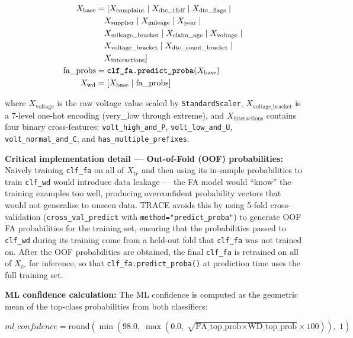 \documentclass[10pt]{article}
\begin{document}
\begin{align}
X_{\text{base}} &= [X_{\text{complaint}} \mid X_{\text{dtc\_tfidf}} \mid X_{\text{dtc\_flags}} \mid {} \notag \\
&\quad X_{\text{supplier}} \mid X_{\text{mileage}} \mid X_{\text{year}} \mid {} \notag \\
&\quad X_{\text{mileage\_bracket}} \mid X_{\text{claim\_age}} \mid X_{\text{voltage}} \mid {} \notag \\
&\quad X_{\text{voltage\_bracket}} \mid X_{\text{dtc\_count\_bracket}} \mid {} \notag \\
&\quad X_{\text{interactions}}] \\
\text{fa\_probs} &= \texttt{clf\_fa.predict\_proba}(X_{\text{base}}) \\
X_{\text{wd}} &= [X_{\text{base}} \mid \text{fa\_probs}]
\end{align}

where \(X_{\text{voltage}}\) is the raw voltage value scaled by \texttt{StandardScaler}, \(X_{\text{voltage\_bracket}}\) is a 7-level one-hot encoding (very\_low through extreme), and \(X_{\text{interactions}}\) contains four binary cross-features: \texttt{volt\_high\_and\_P}, \texttt{volt\_low\_and\_U}, \texttt{volt\_normal\_and\_C}, and \texttt{has\_multiple\_prefixes}.

\textbf{Critical implementation detail --- Out-of-Fold (OOF) probabilities:} Naively training \texttt{clf\_fa} on all of \(X_{tr}\) and then using its in-sample probabilities to train \texttt{clf\_wd} would introduce data leakage --- the FA model would ``know'' the training examples too well, producing overconfident probability vectors that would not generalise to unseen data. TRACE avoids this by using 5-fold cross-validation (\texttt{cross\_val\_predict} with \texttt{method="predict\_proba"}) to generate OOF FA probabilities for the training set, ensuring that the probabilities passed to \texttt{clf\_wd} during its training come from a held-out fold that \texttt{clf\_fa} was not trained on. After the OOF probabilities are obtained, the final \texttt{clf\_fa} is retrained on all of \(X_{tr}\) for inference, so that \texttt{clf\_fa.predict\_proba()} at prediction time uses the full training set.

\textbf{ML confidence calculation:} The ML confidence is computed as the geometric mean of the top-class probabilities from both classifiers:

\begin{equation}
{ml\_confidence} = \mathrm{round}\!\left(\min\!\left(98.0,\; \max\!\left(0.0,\; \sqrt{\text{FA\_top\_prob} \times \text{WD\_top\_prob}} \times 100\right)\right),\; 1\right)
\end{equation}
\end{document}
